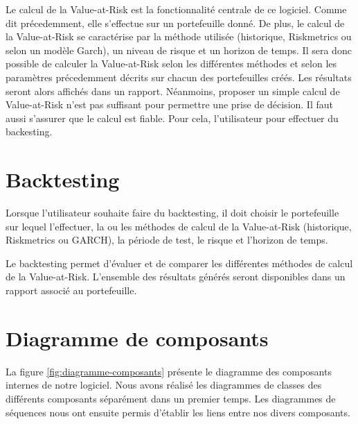 \documentclass[a4paper]{report}
\begin{document}
Le calcul de la Value-at-Risk est la fonctionnalité centrale de ce logiciel. Comme dit précedemment, elle s'effectue sur un portefeuille donné.
De plus, le calcul de la Value-at-Risk se caractérise par la méthode utilisée (historique, Riskmetrics ou selon un modèle Garch), un niveau de risque et un horizon de temps.
Il sera donc possible de calculer la Value-at-Risk selon les différentes méthodes et selon les paramètres précedemment décrits sur chacun des portefeuilles créés.
Les résultats seront alors affichés dans un rapport. Néanmoins, proposer un simple calcul de Value-at-Risk n'est pas suffisant pour permettre une prise de décision.
Il faut aussi s'assurer que le calcul est fiable.
Pour cela, l'utilisateur pour effectuer du backesting.


\section{Backtesting}

Lorsque l’utilisateur souhaite faire du backtesting, il doit choisir le portefeuille sur lequel l’effectuer, la ou les méthodes de calcul de la Value-at-Risk (historique, Riskmetrics ou GARCH), la période de test, le risque et l’horizon de temps.

Le backtesting permet d'évaluer et de comparer les différentes méthodes de calcul de la Value-at-Risk.
L'ensemble des résultats générés seront disponibles dans un rapport associé au portefeuille.


\section{Diagramme de composants}

La figure \ref{fig:diagramme-composants} présente le diagramme des composants internes de notre logiciel.
Nous avons réalisé les diagrammes de classes des différents composants séparément dans un premier temps.
Les diagrammes de séquences nous ont ensuite permis d'établir les liens entre nos divers composants.

\end{document}
